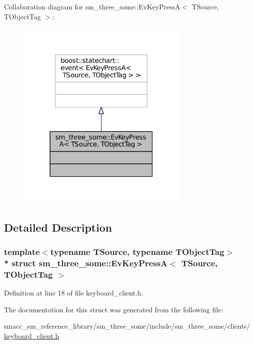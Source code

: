 Collaboration diagram for sm\+\_\+three\+\_\+some\+:\+:Ev\+Key\+PressA$<$ T\+Source, T\+Object\+Tag $>$\+:
\nopagebreak
\begin{figure}[H]
\begin{center}
\leavevmode
\includegraphics[width=235pt]{structsm__three__some_1_1EvKeyPressA__coll__graph}
\end{center}
\end{figure}


\subsection{Detailed Description}
\subsubsection*{template$<$typename T\+Source, typename T\+Object\+Tag$>$\\*
struct sm\+\_\+three\+\_\+some\+::\+Ev\+Key\+Press\+A$<$ T\+Source, T\+Object\+Tag $>$}



Definition at line 18 of file keyboard\+\_\+client.\+h.



The documentation for this struct was generated from the following file\+:\begin{DoxyCompactItemize}
\item 
smacc\+\_\+sm\+\_\+reference\+\_\+library/sm\+\_\+three\+\_\+some/include/sm\+\_\+three\+\_\+some/clients/\hyperlink{keyboard__client_8h}{keyboard\+\_\+client.\+h}\end{DoxyCompactItemize}
